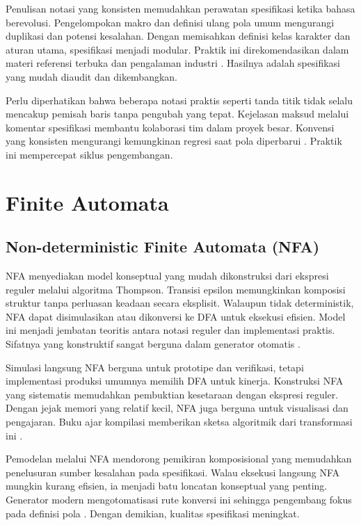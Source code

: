 \documentclass[../main.tex]{subfiles}
\begin{document}
Penulisan notasi yang konsisten memudahkan perawatan spesifikasi ketika bahasa berevolusi. Pengelompokan makro dan definisi ulang pola umum mengurangi duplikasi dan potensi kesalahan. Dengan memisahkan definisi kelas karakter dan aturan utama, spesifikasi menjadi modular. Praktik ini direkomendasikan dalam materi referensi terbuka dan pengalaman industri \citep{FlexManual,CS143}. Hasilnya adalah spesifikasi yang mudah diaudit dan dikembangkan.

Perlu diperhatikan bahwa beberapa notasi praktis seperti tanda titik tidak selalu mencakup pemisah baris tanpa pengubah yang tepat. Kejelasan maksud melalui komentar spesifikasi membantu kolaborasi tim dalam proyek besar. Konvensi yang konsisten mengurangi kemungkinan regresi saat pola diperbarui \citep{WikiRegex}. Praktik ini mempercepat siklus pengembangan.

\section{Finite Automata}
\subsection{Non-deterministic Finite Automata (NFA)}
NFA menyediakan model konseptual yang mudah dikonstruksi dari ekspresi reguler melalui algoritma Thompson. Transisi epsilon memungkinkan komposisi struktur tanpa perluasan keadaan secara eksplisit. Walaupun tidak deterministik, NFA dapat disimulasikan atau dikonversi ke DFA untuk eksekusi efisien. Model ini menjadi jembatan teoritis antara notasi reguler dan implementasi praktis. Sifatnya yang konstruktif sangat berguna dalam generator otomatis \citep{WikiNFA}.

Simulasi langsung NFA berguna untuk prototipe dan verifikasi, tetapi implementasi produksi umumnya memilih DFA untuk kinerja. Konstruksi NFA yang sistematis memudahkan pembuktian kesetaraan dengan ekspresi reguler. Dengan jejak memori yang relatif kecil, NFA juga berguna untuk visualisasi dan pengajaran. Buku ajar kompilasi memberikan sketsa algoritmik dari transformasi ini \citep{Mogensen2010}.

Pemodelan melalui NFA mendorong pemikiran komposisional yang memudahkan penelusuran sumber kesalahan pada spesifikasi. Walau eksekusi langsung NFA mungkin kurang efisien, ia menjadi batu loncatan konseptual yang penting. Generator modern mengotomatisasi rute konversi ini sehingga pengembang fokus pada definisi pola \citep{WikiNFA}. Dengan demikian, kualitas spesifikasi meningkat.
\end{document}
